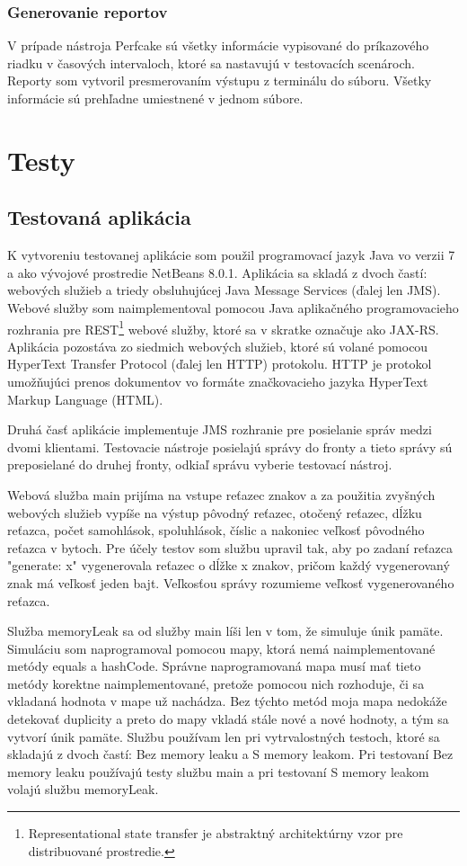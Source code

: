 \documentclass[12pt,oneside,final]{fithesis-utf8}
\begin{document}
\subsection{Generovanie reportov}
V prípade nástroja Perfcake sú všetky informácie vypisované do príkazového riadku v časových intervaloch, ktoré sa nastavujú v testovacích scenároch. Reporty som vytvoril presmerovaním výstupu z terminálu do súboru. Všetky informácie sú prehľadne umiestnené v jednom súbore.

\chapter{Testy}

\section{Testovaná aplikácia}
K vytvoreniu testovanej aplikácie som použil programovací jazyk Java vo verzii 7 a ako vývojové prostredie NetBeans 8.0.1. Aplikácia sa skladá z dvoch častí: webových služieb a triedy obsluhujúcej Java Message Services (ďalej len JMS). Webové služby som naimplementoval pomocou Java aplikačného programovacieho rozhrania pre REST\footnote{Representational state transfer je abstraktný architektúrny vzor pre distribuované prostredie.} webové služby, ktoré sa v skratke označuje ako JAX-RS. Aplikácia pozostáva zo siedmich webových služieb, ktoré sú volané pomocou HyperText Transfer Protocol (ďalej len HTTP) protokolu. HTTP je protokol umožňujúci prenos dokumentov vo formáte značkovacieho jazyka HyperText Markup Language (HTML).
\par Druhá časť aplikácie implementuje JMS rozhranie pre posielanie správ medzi dvomi klientami. Testovacie nástroje posielajú správy do fronty a tieto správy sú preposielané do druhej fronty, odkiaľ správu vyberie testovací nástroj.
\par Webová služba main prijíma na vstupe reťazec znakov a za použitia zvyšných webových služieb vypíše na výstup pôvodný reťazec, otočený reťazec, dĺžku reťazca, počet samohlások, spoluhlások, číslic a nakoniec veľkosť pôvodného reťazca v bytoch. Pre účely testov som službu upravil tak, aby po zadaní reťazca "{}generate: x" vygenerovala reťazec o dĺžke x znakov, pričom každý vygenerovaný znak má veľkosť jeden bajt. Veľkosťou správy rozumieme veľkosť vygenerovaného reťazca.
\par Služba memoryLeak sa od služby main líši len v tom, že simuluje únik pamäte. Simuláciu som naprogramoval pomocou mapy, ktorá nemá naimplementované metódy equals a hashCode. Správne naprogramovaná mapa musí mať tieto metódy korektne naimplementované, pretože pomocou nich rozhoduje, či sa vkladaná hodnota v mape už nachádza. Bez týchto metód moja mapa nedokáže detekovať duplicity a preto do mapy vkladá stále nové a nové hodnoty, a tým sa vytvorí únik pamäte. Službu používam len pri vytrvalostných testoch, ktoré sa skladajú z dvoch častí: Bez memory leaku a S memory leakom. Pri testovaní Bez memory leaku používajú testy službu main a pri testovaní S memory leakom volajú službu memoryLeak.
\end{document}
